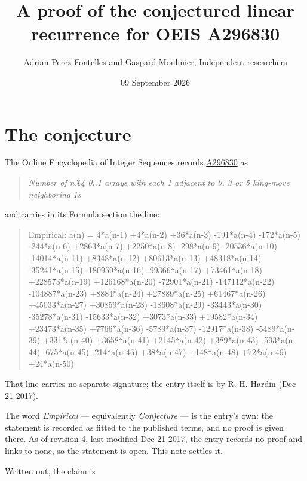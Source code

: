 \documentclass[11pt]{article}
\title{A proof of the conjectured linear recurrence for OEIS A296830}
\author{Adrian Perez Fontelles and Gaspard Moulinier, Independent researchers}
\date{09 September 2026}
\theoremstyle{definition}
\begin{document}
\maketitle
\section{The conjecture}

The Online Encyclopedia of Integer Sequences records \href{https://oeis.org/A296830}{A296830} as

\begin{quote}\itshape Number of nX4 0..1 arrays with each 1 adjacent to 0, 3 or 5 king-move neighboring 1s\end{quote}

and carries in its Formula section the line:

\begin{quote}\ttfamily Empirical: a(n) = 4*a(n-1) +4*a(n-2) +36*a(n-3) -191*a(n-4) -172*a(n-5) -244*a(n-6) +2863*a(n-7) +2250*a(n-8) -298*a(n-9) -20536*a(n-10) -14014*a(n-11) +8348*a(n-12) +80613*a(n-13) +48318*a(n-14) -35241*a(n-15) -180959*a(n-16) -99366*a(n-17) +73461*a(n-18) +228573*a(n-19) +126168*a(n-20) -72901*a(n-21) -147112*a(n-22) -104887*a(n-23) +8884*a(n-24) +27889*a(n-25) +61467*a(n-26) +45033*a(n-27) +30859*a(n-28) -18608*a(n-29) -33443*a(n-30) -35278*a(n-31) -15633*a(n-32) +3073*a(n-33) +19582*a(n-34) +23473*a(n-35) +7766*a(n-36) -5789*a(n-37) -12917*a(n-38) -5489*a(n-39) +331*a(n-40) +3658*a(n-41) +2145*a(n-42) +389*a(n-43) -593*a(n-44) -675*a(n-45) -214*a(n-46) +38*a(n-47) +148*a(n-48) +72*a(n-49) +24*a(n-50)\end{quote}

That line carries no separate signature; the entry itself is by R. H. Hardin (Dec 21 2017).

The word {\itshape Empirical} --- equivalently {\itshape Conjecture} --- is the entry's own: the statement is recorded as fitted to the published terms, and no proof is given there. As of revision 4, last modified Dec 21 2017, the entry records no proof and links to none, so the statement is open. This note settles it.

Written out, the claim is
\end{document}
